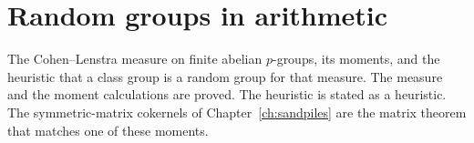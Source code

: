 \chapter{Random groups in arithmetic}\label{ch:oc-classgroups}\label{ch:cohenlenstra}

The Cohen--Lenstra measure on finite abelian $p$-groups, its moments, and the heuristic that a class group is a random group for that measure. The measure and the moment calculations are proved. The heuristic is stated as a heuristic. The symmetric-matrix cokernels of Chapter~\ref{ch:sandpiles} are the matrix theorem that matches one of these moments.


